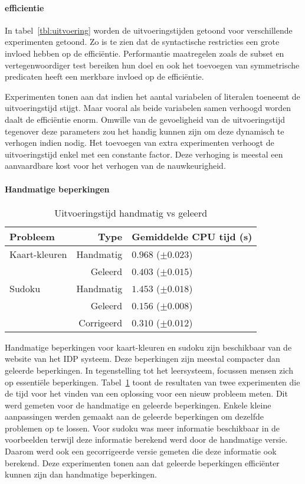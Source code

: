 \paragraph{efficientie}
In tabel~\ref{tbl:uitvoering} worden de uitvoeringstijden getoond voor verschillende experimenten getoond.
Zo is te zien dat de syntactische restricties een grote invloed hebben op de effici\"entie.
Performantie maatregelen zoals de subset en vertegenwoordiger test bereiken hun doel en ook het toevoegen van symmetrische predicaten heeft een merkbare invloed op de effici\"entie.

Experimenten tonen aan dat indien het aantal variabelen of literalen toeneemt de uitvoeringstijd stijgt.
Maar vooral als beide variabelen samen verhoogd worden daalt de effici\"entie enorm.
Omwille van de gevoeligheid van de uitvoeringstijd tegenover deze parameters zou het handig kunnen zijn om deze dynamisch te verhogen indien nodig.
Het toevoegen van extra experimenten verhoogt de uitvoeringstijd enkel met een constante factor.
Deze verhoging is meestal een aanvaardbare kost voor het verhogen van de nauwkeurigheid.

\paragraph{Handmatige beperkingen}
  \begin{table}[!htp]
    \caption{Uitvoeringstijd handmatig vs geleerd}
    \begin{tabularx}{\linewidth}{lr|X}
      \textbf{Probleem} & \textbf{Type} & \textbf{Gemiddelde CPU tijd (s)} \\
      \toprule
      Kaart-kleuren & Handmatig & $0.968$  ($\pm 0.023$) \\
      & Geleerd & $0.403$       ($\pm 0.015$) \\
      \midrule
      Sudoku & Handmatig & $1.453$    ($\pm 0.018$) \\ 
      & Geleerd & $0.156$       ($\pm 0.008$) \\
      & Corrigeerd & $0.310$       ($\pm 0.012$)
    \end{tabularx}
    \label{tbl:mens}
  \end{table}
Handmatige beperkingen voor kaart-kleuren en sudoku zijn beschikbaar van de website van het IDP systeem.
Deze beperkingen zijn meestal compacter dan geleerde beperkingen.
In tegenstelling tot het leersysteem, focussen mensen zich op essenti\"ele beperkingen.
Tabel~\ref{tbl:mens} toont de resultaten van twee experimenten die de tijd voor het vinden van een oplossing voor een nieuw probleem meten.
Dit werd gemeten voor de handmatige en geleerde beperkingen.
Enkele kleine aanpassingen werden gemaakt aan de geleerde beperkingen om dezelfde problemen op te lossen.
Voor sudoku was meer informatie beschikbaar in de voorbeelden terwijl deze informatie berekend werd door de handmatige versie.
Daarom werd ook een gecorrigeerde versie gemeten die deze informatie ook berekend.
Deze experimenten tonen aan dat geleerde beperkingen effici\"enter kunnen zijn dan handmatige beperkingen.

